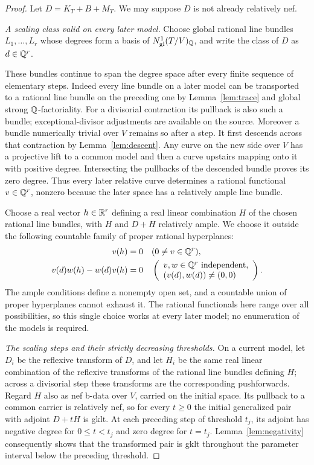 \begin{proof}
Let $D=K_T+B+M_T$.  We may suppose $D$ is not already relatively
nef.

\smallskip
\noindent\emph{A scaling class valid on every later model.}
Choose global rational line bundles $L_1,\ldots,L_r$ whose
degrees form a basis of $N^1_{\mathrm{gl}}(T/V)_{\mathbb Q}$, and write
the class of $D$ as $d\in\mathbb Q^r$.

These bundles continue to span the degree space after every finite
sequence of elementary steps.  Indeed every line bundle on a later
model can be transported to a rational line bundle on the preceding
one by Lemma~\ref{lem:trace} and global strong $\mathbb Q$-factoriality.
For a divisorial contraction its pullback is also such a bundle;
exceptional-divisor adjustments are available on the source.
Moreover a bundle numerically trivial over $V$ remains so after a
step.  It first descends across that contraction by
Lemma~\ref{lem:descent}.  Any curve on the new side over $V$ has a
projective lift to a common model and then a curve upstairs mapping
onto it with positive degree.  Intersecting the pullbacks of the
descended bundle proves its zero degree.  Thus every later relative
curve determines a rational functional $v\in\mathbb Q^r$, nonzero because
the later space has a relatively ample line bundle.

Choose a real vector $h\in\mathbb R^r$ defining a real linear combination
$H$ of the chosen rational line bundles, with $H$ and $D+H$
relatively ample.  We choose it outside
the following countable family of proper rational hyperplanes:
\begin{align}
 v(h)&=0 &&(0\ne v\in\mathbb Q^r),\label{eq:scaling-generic1}\\
 v(d)w(h)-w(d)v(h)&=0
 &&\left(\begin{array}{l}v,w\in\mathbb Q^r\text{ independent},\\
                  (v(d),w(d))\ne(0,0)\end{array}\right).
 \label{eq:scaling-generic2}
\end{align}
The ample conditions define a nonempty open set, and a countable
union of proper hyperplanes cannot exhaust it.  The rational
functionals here range over all possibilities, so this single choice
works at every later model; no enumeration of the models is required.

\smallskip
\noindent\emph{The scaling steps and their strictly decreasing thresholds.}
On a current model, let $D_i$ be the reflexive transform of $D$,
and let $H_i$ be the same real linear combination of the reflexive
transforms of the rational line bundles defining $H$; across a
divisorial step these transforms are the corresponding pushforwards.
Regard $H$
also as nef b-data over $V$, carried on the initial space.  Its
pullback to a common carrier is relatively nef, so for every
$t\geq0$ the initial generalized pair with adjoint $D+tH$ is gklt.
At each preceding step of threshold $t_j$, its adjoint has negative
degree for $0\leq t<t_j$ and zero degree for $t=t_j$.
Lemma~\ref{lem:negativity} consequently shows that the transformed
pair is gklt throughout the parameter interval below the preceding
threshold.


\end{proof}
